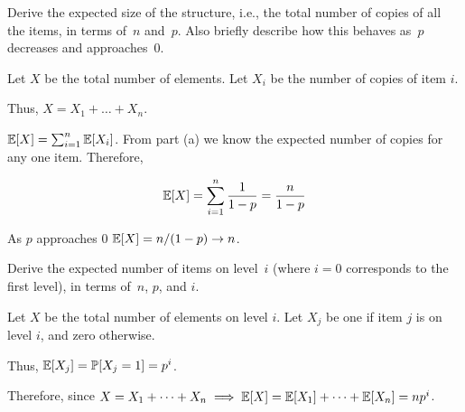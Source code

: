 \documentclass[12pt, letterpaper]{article}
\renewcommand{\P}{\mathbb{P}}
\begin{document}
\begin{subproblem}{}
    Derive the expected size of the structure, i.e., the total number of copies of all the items, in terms of~$n$ and~$p$.
    Also briefly describe how this behaves as~$p$ decreases and approaches~$0$.
\end{subproblem}
\begin{problemproof}
    Let $X$ be the total number of elements. Let $X_i$ be the number of copies of item $i$.

    Thus, $X=X_1+\dots+X_n$.

    $\mathbb{E}[X]=\sum_{i=1}^n \mathbb{E}[X_i]$. From part (a) we know the expected number of copies for any one item. Therefore,

    \[\mathbb{E}[X]=\sum_{i=1}^n \dfrac{1}{1-p}= \dfrac{n}{1-p}\]

    As $p$ approaches $0$ $\mathbb{E}[X]=n/(1-p) \to n$.
\end{problemproof}

\begin{subproblem}{}
    Derive the expected number of items on level~$i$ (where $i=0$ corresponds to the first level), in terms of~$n$, $p$, and $i$.
\end{subproblem}
\begin{problemproof}
    Let $X$ be the total number of elements on level $i$. Let $X_j$ be one if item $j$ is on level $i$, and zero otherwise.
    
    Thus, $\E[X_j]=\P[X_j=1]=p^i$.

    Therefore, since $X=X_1+\dots+X_n \implies \mathbb{E}[X]=\mathbb{E}[X_1]+\dots+\mathbb{E}[X_n]=np^i$.
\end{problemproof}
\end{document}
